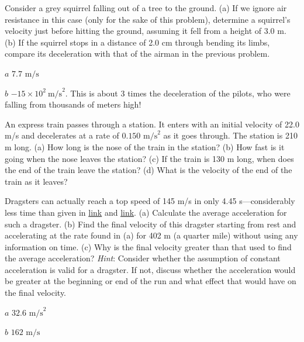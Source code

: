 \documentclass[
]{book}
\begin{document}
\hypertarget{fs-id1164906495944}{}
\leavevmode{}%
Consider a grey squirrel falling out of a tree to the ground. (a) If we
ignore air resistance in this case (only for the sake of this problem),
determine a squirrel's velocity just before hitting the ground,
assuming it fell from a height of 3.0 m. (b) If the squirrel stops in a
distance of 2.0 cm through bending its limbs, compare its deceleration
with that of the airman in the previous problem.

\leavevmode{}%
\(a\) \({7\text{.}\text{7\ m/s}}{}\)

\(b\) \({{{- \text{15}} \times \text{10}^{2}}\ \text{m/s}^{2}}{}\). This
is about 3 times the deceleration of the pilots, who were falling from
thousands of meters high!

\hypertarget{fs-id1164906433746}{}
\leavevmode{}%
An express train passes through a station. It enters with an initial
velocity of 22.0 m/s and decelerates at a rate of
\({0\text{.}\text{150\ m/s}^{2}}{}\) as it goes through. The station is
210 m long. (a) How long is the nose of the train in the station? (b)
How fast is it going when the nose leaves the station? (c) If the train
is 130 m long, when does the end of the train leave the station? (d)
What is the velocity of the end of the train as it leaves?

\hypertarget{fs-id1164906502756}{}
\leavevmode{}%
Dragsters can actually reach a top speed of 145 m/s in only 4.45
s---considerably less time than given in
\protect\hyperlink{fs-id1164906457202}{link} and
\protect\hyperlink{fs-id1164906443776}{link}. (a) Calculate the
average acceleration for such a dragster. (b) Find the final velocity of
this dragster starting from rest and accelerating at the rate found in
(a) for 402 m (a quarter mile) without using any information on time.
(c) Why is the final velocity greater than that used to find the average
acceleration? \emph{Hint}: Consider whether the assumption of constant
acceleration is valid for a dragster. If not, discuss whether the
acceleration would be greater at the beginning or end of the run and
what effect that would have on the final velocity.

\leavevmode{}%
\(a\) \({\text{32}\text{.}\text{6\ m/s}^{2}}{}\)

\(b\) \(\text{162\ m/s}{}\)
\end{document}
